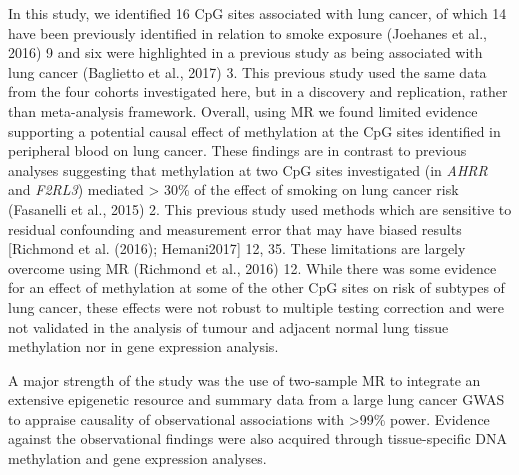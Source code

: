 \documentclass[11pt,twoside]{bristolthesis}
\begin{document}
In this study, we identified 16 CpG sites associated with lung cancer, of which 14 have been previously identified in relation to smoke exposure (Joehanes et al., 2016) 9 and six were highlighted in a previous study as being associated with lung cancer (Baglietto et al., 2017) 3. This previous study used the same data from the four cohorts investigated here, but in a discovery and replication, rather than meta-analysis framework. Overall, using MR we found limited evidence supporting a potential causal effect of methylation at the CpG sites identified in peripheral blood on lung cancer. These findings are in contrast to previous analyses suggesting that methylation at two CpG sites investigated (in \emph{AHRR} and \emph{F2RL3}) mediated \textgreater{} 30\% of the effect of smoking on lung cancer risk (Fasanelli et al., 2015) 2. This previous study used methods which are sensitive to residual confounding and measurement error that may have biased results {[}Richmond et al. (2016); Hemani2017{]} 12, 35. These limitations are largely overcome using MR (Richmond et al., 2016) 12. While there was some evidence for an effect of methylation at some of the other CpG sites on risk of subtypes of lung cancer, these effects were not robust to multiple testing correction and were not validated in the analysis of tumour and adjacent normal lung tissue methylation nor in gene expression analysis.

A major strength of the study was the use of two-sample MR to integrate an extensive epigenetic resource and summary data from a large lung cancer GWAS to appraise causality of observational associations with \textgreater99\% power. Evidence against the observational findings were also acquired through tissue-specific DNA methylation and gene expression analyses.
\end{document}
